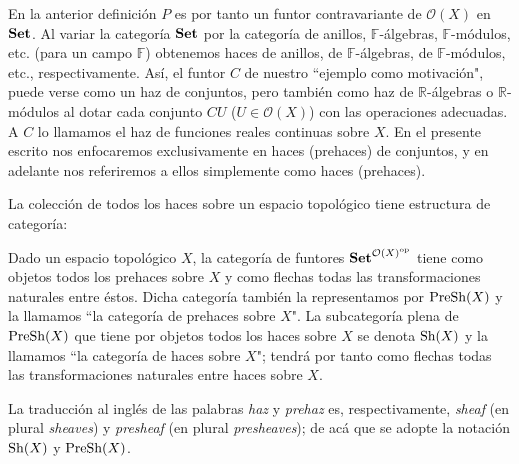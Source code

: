 En la anterior definición $P$ es por tanto un funtor contravariante de $\mathcal{O}(X)$ en $\normalfont{\textbf{Set}}$. Al variar la categoría $\normalfont{\textbf{Set}}$ por la categoría de anillos, $\mathbb{F}$-álgebras, $\mathbb{F}$-módulos, etc. (para un campo $\mathbb{F}$) obtenemos haces de anillos, de $\mathbb{F}$-álgebras, de $\mathbb{F}$-módulos, etc., respectivamente. Así, el funtor $C$ de nuestro ``ejemplo como motivación", puede verse como un haz de conjuntos, pero también como haz de $\mathbb{R}$-álgebras o $\mathbb{R}$-módulos al dotar cada conjunto $CU$ ($U\in \mathcal{O}(X)$) con las operaciones adecuadas. A $C$ lo llamamos el haz de funciones reales continuas sobre $X$. En el presente escrito nos enfocaremos exclusivamente en haces (prehaces) de conjuntos, y en adelante nos referiremos a ellos simplemente como haces (prehaces).

La colección de todos los haces sobre un espacio topológico tiene estructura de categoría:
\begin{Def}
   Dado un espacio topológico $X$, la categoría de funtores $\normalfont{\textbf{Set}}^{{\mathcal{O}(X)}^{\text{op}}}$ tiene como objetos todos los prehaces sobre $X$ y como flechas todas las transformaciones naturales entre éstos. Dicha categoría también la representamos por $\normalfont{\text{PreSh}} (X)$ y la llamamos ``la categoría de prehaces sobre $X$". La subcategoría plena de $\normalfont{\text{PreSh}} (X)$ que tiene por objetos todos los haces sobre $X$ se denota $\normalfont{\text{Sh}}(X)$ y la llamamos ``la categoría de haces sobre $X$"; tendrá por tanto como flechas todas las transformaciones naturales entre haces sobre $X$. 
\end{Def}
La traducción al inglés de las palabras \textit{haz} y \textit{prehaz} es, respectivamente, \textit{sheaf} (en plural \textit{sheaves}) y \textit{presheaf} (en plural \textit{presheaves}); de acá que se adopte la notación $\normalfont{\text{Sh}} (X)$ y $\normalfont{\text{PreSh}} (X)$.
